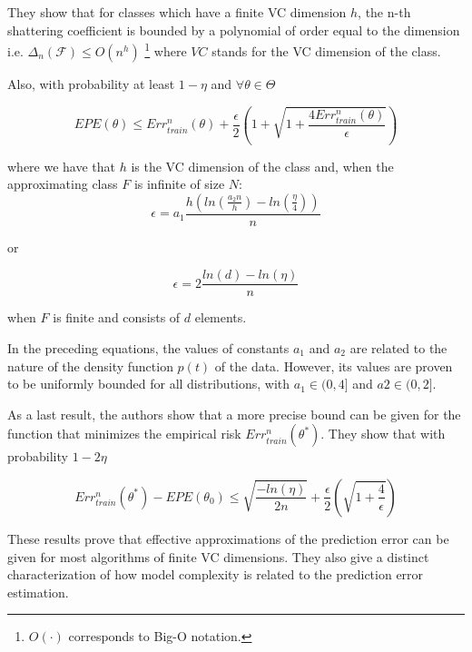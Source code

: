 They show that for classes which have a finite VC dimension $h$, the n-th shattering coefficient is bounded by a polynomial of order equal to the dimension
i.e. $\Delta_n(\mathcal {F}) \leq O(n^{h})$ \footnote{$O(\cdot)$ corresponds to Big-O notation.} where $VC$ stands for the VC dimension of the class.

Also, with probability at least $1 - \eta$ and $\forall \theta \in \Theta$

\begin{equation}\label{vapnik-classificationBound}
EPE(\theta) \leq  Err^n_{train}(\theta) + \frac{\epsilon}{2} \left(1 + \sqrt{1 + \frac{4 Err^n_{train}(\theta)  }{\epsilon}}  \right)
\end{equation}

where we have that $h$ is the VC dimension of the class and, when the approximating class $F$ is infinite of size $N$:
\begin{equation}\label{vapnik-epsilonBound}
\epsilon = a_1 \frac{h \left( ln(\frac{a_2 n}{h} ) -  ln(\frac{\eta}{4} ) \right)}{n}
\end{equation}

or

\begin{equation}\label{vapnik-epsilonBound}
\epsilon = 2 \frac{ ln(d) - ln(\eta)}{n}
\end{equation}

when $F$ is finite and consists of $d$ elements.

In the preceding equations, the values of constants $a_1$ and $a_2$ are related to the nature of the density function $p(t)$ of the data. However, its values are proven to be uniformly bounded for all distributions, with $a_1 \in (0,4 ]$ and $a2 \in (0,2 ]$.

As a last result, the authors show that a more precise bound can be given for the function that minimizes the empirical risk $Err^n_{train}(\theta^*)$. They show that with probability $1 - 2\eta$

\begin{equation}\label{vapnik-classificationBoundPrecise}
Err^n_{train}(\theta^*) - EPE(\theta_0) \leq  \sqrt{\frac{-ln(\eta)}{2n} } + \frac{\epsilon}{2}\left( \sqrt{1 + \frac{4}{\epsilon} } \right)
\end{equation}

These results prove that effective approximations of the prediction error can be given for most algorithms of finite VC dimensions. They also give a distinct characterization of how model complexity is related to the prediction error estimation.

